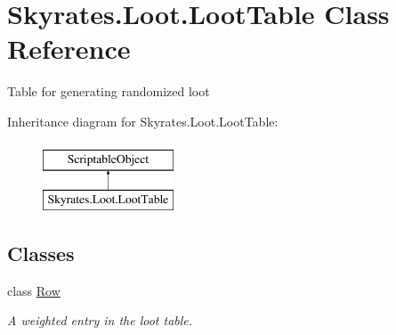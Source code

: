 \hypertarget{class_skyrates_1_1_loot_1_1_loot_table}{\section{Skyrates.\-Loot.\-Loot\-Table Class Reference}
\label{class_skyrates_1_1_loot_1_1_loot_table}
}


Table for generating randomized loot  


Inheritance diagram for Skyrates.\-Loot.\-Loot\-Table\-:\begin{figure}[H]
\begin{center}
\leavevmode
\includegraphics[height=2.000000cm]{class_skyrates_1_1_loot_1_1_loot_table}
\end{center}
\end{figure}
\subsection*{Classes}
\begin{DoxyCompactItemize}
\item 
class \hyperlink{class_skyrates_1_1_loot_1_1_loot_table_1_1_row}{Row}
\begin{DoxyCompactList}\small\item\em A weighted entry in the loot table. \end{DoxyCompactList}\end{DoxyCompactItemize}
